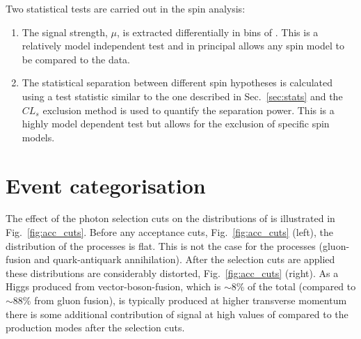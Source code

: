 Two statistical tests are carried out in the spin analysis:

\begin{enumerate}
  \item The signal strength, $\mu$, is extracted differentially in bins of \abscostheta. This is a relatively model independent test and in principal allows any spin model to be compared to the data.
  \item The statistical separation between different spin hypotheses is calculated using a test statistic similar to the one described in Sec.~\ref{sec:stats} and the $CL_{s}$ exclusion method is used to quantify the separation power. This is a highly model dependent test but allows for the exclusion of specific spin models.
\end{enumerate}

\section{Event categorisation}
\label{sec:spin_cats}

The effect of the photon selection cuts on the distributions of 
\abscostheta is illustrated in Fig.~\ref{fig:acc_cuts}. Before any acceptance cuts, Fig.~\ref{fig:acc_cuts} (left), the \abscostheta
distribution of the \zerop processes is flat. This is not the case for the \twomp processes (gluon-fusion and quark-antiquark annihilation). After the selection cuts are applied these distributions are considerably distorted, Fig.~\ref{fig:acc_cuts} (right). As a Higgs produced from vector-boson-fusion, which is $\sim$8\% of the total (compared to $\sim$88\% from gluon fusion),  is typically produced at higher transverse momentum there is some additional contribution of \zerop signal at high values of \abscostheta compared to the \twomp production modes after the selection cuts.

